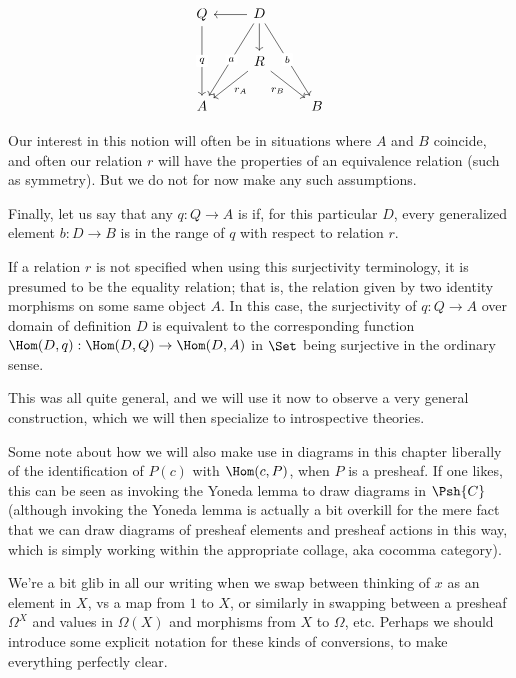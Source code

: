\[\begin{tikzcd}
	Q & D \\
	& R \\
	A && B
	\arrow["{r_A}", from=2-2, to=3-1]
	\arrow["{r_B}"', from=2-2, to=3-3]
	\arrow[from=1-2, to=2-2]
	\arrow["a"{description}, from=1-2, to=3-1]
	\arrow["b"{description}, from=1-2, to=3-3]
	\arrow["q"{description}, from=1-1, to=3-1]
	\arrow[from=1-2, to=1-1]
\end{tikzcd}\]

Our interest in this notion will often be in situations where $A$ and $B$ coincide, and often our relation $r$ will have the properties of an equivalence relation (such as symmetry). But we do not for now make any such assumptions.

Finally, let us say that any $q : Q \to A$ is  if, for this particular $D$, every generalized element $b : D \to B$ is in the range of $q$ with respect to relation $r$.

If a relation $r$ is not specified when using this surjectivity terminology, it is presumed to be the equality relation; that is, the relation given by two identity morphisms on some same object $A$. In this case, the surjectivity of $q : Q \to A$ over domain of definition $D$ is equivalent to the corresponding function $\Hom(D, q) : \Hom(D, Q) \to \Hom(D, A)$ in $\Set$ being surjective in the ordinary sense.

This was all quite general, and we will use it now to observe a very general construction, which we will then specialize to introspective theories.

\begin{TODOblock}
Some note about how we will also make use in diagrams in this chapter liberally of the identification of $P(c)$ with $\Hom(c, P)$, when $P$ is a presheaf. If one likes, this can be seen as invoking the Yoneda lemma to draw diagrams in $\Psh{C}$ (although invoking the Yoneda lemma is actually a bit overkill for the mere fact that we can draw diagrams of presheaf elements and presheaf actions in this way, which is simply working within the appropriate collage, aka cocomma category).

We're a bit glib in all our writing when we swap between thinking of $x$ as an element in $X$, vs a map from $1$ to $X$, or similarly in swapping between a presheaf $\Omega^X$ and values in $\Omega(X)$ and morphisms from $X$ to $\Omega$, etc. Perhaps we should introduce some explicit notation for these kinds of conversions, to make everything perfectly clear.
\end{TODOblock}


